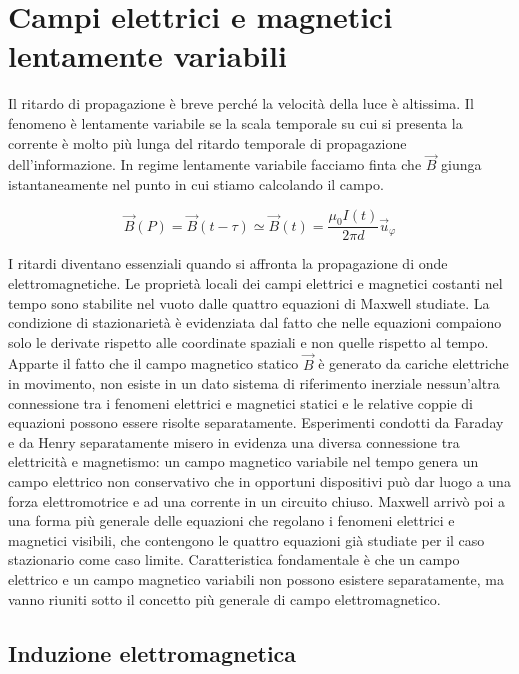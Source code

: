 \chapter{Campi elettrici e magnetici lentamente variabili}

Il ritardo di propagazione è breve perché la velocità della luce è altissima. Il fenomeno è lentamente variabile se la scala temporale su cui si presenta la corrente è molto più lunga del ritardo temporale di propagazione dell'informazione. In regime lentamente variabile facciamo finta che $\vec{B}$ giunga istantaneamente nel punto in cui stiamo calcolando il campo.

\[
	\vec{B} (P)=\vec{B} (t-\tau) \simeq \vec{B} (t)=\frac{\mu_0 I(t)}{2\pi d}\vec{u}_{\varphi}
\]

I ritardi diventano essenziali quando si affronta la propagazione di onde elettromagnetiche.
Le proprietà locali dei campi elettrici e magnetici costanti nel tempo sono stabilite nel vuoto dalle quattro equazioni di Maxwell studiate. La condizione di stazionarietà è evidenziata dal fatto che nelle equazioni compaiono solo le derivate rispetto alle coordinate spaziali e non quelle rispetto al tempo. Apparte il fatto che il campo magnetico statico $\vec{B}$ è generato da cariche elettriche in movimento, non esiste in un dato sistema di riferimento inerziale nessun'altra connessione tra i fenomeni elettrici e magnetici statici e le relative coppie di equazioni possono essere risolte separatamente. Esperimenti condotti da Faraday e da Henry separatamente misero in evidenza una diversa connessione tra elettricità e magnetismo: un campo magnetico variabile nel tempo genera un campo elettrico non conservativo che in opportuni dispositivi può dar luogo a una forza elettromotrice e ad una corrente in un circuito chiuso. Maxwell arrivò poi a una forma più generale delle equazioni che regolano i fenomeni elettrici e magnetici visibili, che contengono le quattro equazioni già studiate per il caso stazionario come caso limite. Caratteristica fondamentale è che un campo elettrico e un campo magnetico variabili non possono esistere separatamente, ma vanno riuniti sotto il concetto più generale di campo elettromagnetico.

\section{Induzione elettromagnetica}


